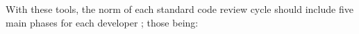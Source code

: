 \noindent With these tools, the norm of each standard code review cycle should include five main phases for each developer \cite{chess2007secure}; those being:


